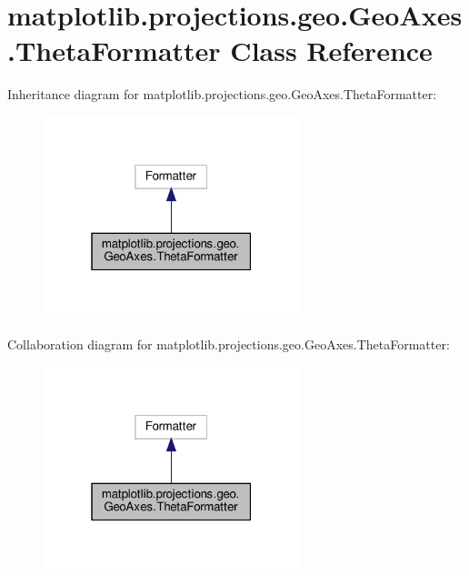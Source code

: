 \hypertarget{classmatplotlib_1_1projections_1_1geo_1_1GeoAxes_1_1ThetaFormatter}{}\section{matplotlib.\+projections.\+geo.\+Geo\+Axes.\+Theta\+Formatter Class Reference}
\label{classmatplotlib_1_1projections_1_1geo_1_1GeoAxes_1_1ThetaFormatter}


Inheritance diagram for matplotlib.\+projections.\+geo.\+Geo\+Axes.\+Theta\+Formatter\+:
\nopagebreak
\begin{figure}[H]
\begin{center}
\leavevmode
\includegraphics[width=211pt]{classmatplotlib_1_1projections_1_1geo_1_1GeoAxes_1_1ThetaFormatter__inherit__graph}
\end{center}
\end{figure}


Collaboration diagram for matplotlib.\+projections.\+geo.\+Geo\+Axes.\+Theta\+Formatter\+:
\nopagebreak
\begin{figure}[H]
\begin{center}
\leavevmode
\includegraphics[width=211pt]{classmatplotlib_1_1projections_1_1geo_1_1GeoAxes_1_1ThetaFormatter__coll__graph}
\end{center}
\end{figure}
